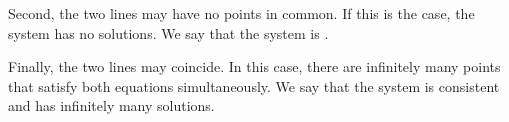 \documentclass{ximera}
\begin{document}
\begin{center}
\end{center}
Second, the two lines may have no points in common.  If this is the case, the system has no solutions.  We say that the system is .  
\begin{center}
\end{center}
Finally, the two lines may coincide.  In this case, there are infinitely many points that satisfy both equations simultaneously.  We say that the system is consistent and has infinitely many solutions.
\begin{center}
\end{center}
\end{document}
